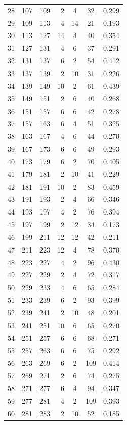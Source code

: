 \documentclass[12pt]{article}
\theoremstyle{plain}
\theoremstyle{definition}
\theoremstyle{remark}
\begin{document}
\begin{center}
\begin{small}
\begin{longtable}{@{}crrrccc@{}}
28 & 107 & 109 & 2 & 4 & 32 & 0.299 \\
29 & 109 & 113 & 4 & 14 & 21 & 0.193 \\
30 & 113 & 127 & 14 & 4 & 40 & 0.354 \\
31 & 127 & 131 & 4 & 6 & 37 & 0.291 \\
32 & 131 & 137 & 6 & 2 & 54 & 0.412 \\
33 & 137 & 139 & 2 & 10 & 31 & 0.226 \\
34 & 139 & 149 & 10 & 2 & 61 & 0.439 \\
35 & 149 & 151 & 2 & 6 & 40 & 0.268 \\
36 & 151 & 157 & 6 & 6 & 42 & 0.278 \\
37 & 157 & 163 & 6 & 4 & 51 & 0.325 \\
38 & 163 & 167 & 4 & 6 & 44 & 0.270 \\
39 & 167 & 173 & 6 & 6 & 49 & 0.293 \\
40 & 173 & 179 & 6 & 2 & 70 & 0.405 \\
41 & 179 & 181 & 2 & 10 & 41 & 0.229 \\
42 & 181 & 191 & 10 & 2 & 83 & 0.459 \\
43 & 191 & 193 & 2 & 4 & 66 & 0.346 \\
44 & 193 & 197 & 4 & 2 & 76 & 0.394 \\
45 & 197 & 199 & 2 & 12 & 34 & 0.173 \\
46 & 199 & 211 & 12 & 12 & 42 & 0.211 \\
47 & 211 & 223 & 12 & 4 & 78 & 0.370 \\
48 & 223 & 227 & 4 & 2 & 96 & 0.430 \\
49 & 227 & 229 & 2 & 4 & 72 & 0.317 \\
50 & 229 & 233 & 4 & 6 & 65 & 0.284 \\
51 & 233 & 239 & 6 & 2 & 93 & 0.399 \\
52 & 239 & 241 & 2 & 10 & 48 & 0.201 \\
53 & 241 & 251 & 10 & 6 & 65 & 0.270 \\
54 & 251 & 257 & 6 & 6 & 68 & 0.271 \\
55 & 257 & 263 & 6 & 6 & 75 & 0.292 \\
56 & 263 & 269 & 6 & 2 & 109 & 0.414 \\
57 & 269 & 271 & 2 & 6 & 74 & 0.275 \\
58 & 271 & 277 & 6 & 4 & 94 & 0.347 \\
59 & 277 & 281 & 4 & 2 & 109 & 0.393 \\
60 & 281 & 283 & 2 & 10 & 52 & 0.185 \\

\end{longtable}
\end{small}
\end{center}
\end{document}
